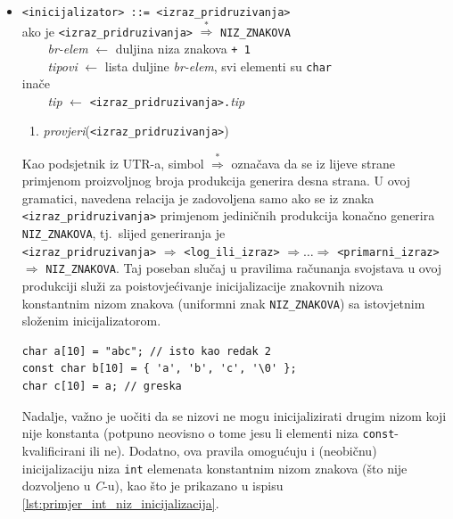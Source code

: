 \documentclass[times, 12pt, utf8]{book}
\begin{document}
\begin{itemize}

\item
\verb|<inicijalizator> ::= <izraz_pridruzivanja>|\\
ako je \verb|<izraz_pridruzivanja>| \(\stackrel{*}{\Rightarrow}\) \verb|NIZ_ZNAKOVA|\\
\verb|    |\emph{br-elem} \(\leftarrow\) duljina niza znakova \verb|+ 1|\\
\verb|    |\emph{tipovi} \(\leftarrow\) lista duljine \emph{br-elem}, svi elementi su \verb|char|\\
inače\\
\verb|    |\emph{tip} \(\leftarrow\) \verb|<izraz_pridruzivanja>.|\emph{tip}
\begin{enumerate}
\item
\emph{provjeri}(\verb|<izraz_pridruzivanja>|)
\end{enumerate}

Kao podsjetnik iz UTR-a, simbol \(\stackrel{*}{\Rightarrow}\) označava da se iz lijeve strane primjenom proizvoljnog broja produkcija generira desna strana.
U ovoj gramatici, navedena relacija je zadovoljena samo ako se iz znaka \verb|<izraz_pridruzivanja>| primjenom jediničnih produkcija konačno generira \verb|NIZ_ZNAKOVA|, tj.~slijed generiranja je\\
\verb|<izraz_pridruzivanja>| \(\Rightarrow\) \verb|<log_ili_izraz>| \(\Rightarrow \ldots \Rightarrow\) \verb|<primarni_izraz>| \(\Rightarrow\) \verb|NIZ_ZNAKOVA|.
Taj poseban slučaj u pravilima računanja svojstava u ovoj produkciji služi za poistovjećivanje inicijalizacije znakovnih nizova konstantnim nizom znakova (uniformni znak \verb|NIZ_ZNAKOVA|) sa istovjetnim složenim inicijalizatorom.

\begin{lstlisting}[caption={Dva istovjetna načina inicijalizacije niza znakova i greška.},label=lst:primjer_string_inicijalizacija]
char a[10] = "abc"; // isto kao redak 2
const char b[10] = { 'a', 'b', 'c', '\0' };
char c[10] = a; // greska
\end{lstlisting}

Nadalje, važno je uočiti da se nizovi ne mogu inicijalizirati drugim nizom koji nije konstanta (potpuno neovisno o tome jesu li elementi niza \verb|const|-kvalificirani ili ne).
Dodatno, ova pravila omogućuju i (neobičnu) inicijalizaciju niza \verb|int| elemenata konstantnim nizom znakova (što nije dozvoljeno u \emph{C}-u), kao što je prikazano u ispisu \ref{lst:primjer_int_niz_inicijalizacija}.


\end{itemize}
\end{document}
